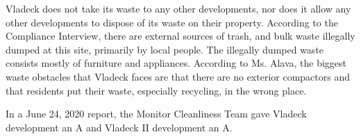 Vladeck does not take its waste to any other developments, nor does it allow any other developments to dispose of its waste on their property. According to the Compliance Interview, there are external sources of trash, and bulk waste illegally dumped at this site, primarily by local people. The illegally dumped waste consists mostly of furniture and appliances. According to Ms. Alava, the biggest waste obstacles that Vladeck faces are that there are no exterior compactors and that residents put their waste, especially recycling, in the wrong place.

In a June 24, 2020 report, the Monitor Cleanliness Team gave Vladeck development an A and Vladeck II development an A.